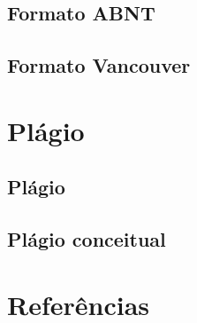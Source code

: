 \documentclass{beamer}
\begin{document}
\subsection{Formato ABNT}

\subsection{Formato Vancouver}


\section{Plágio}

\subsection{Plágio}

\subsection{Plágio conceitual}


\section{Referências}
\end{document}
